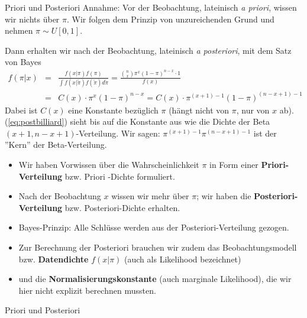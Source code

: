 \documentclass[german]{beamer}
\numberwithin{Bsp}{section}
\numberwithin{Def}{section}
\numberwithin{Stz}{section}
\begin{document}
\begin{frame}{Priori und Posteriori}
Annahme: Vor der Beobachtung, lateinisch \textit{a priori}, wissen wir nichts über $\pi$. Wir folgen dem Prinzip von unzureichenden Grund und nehmen $\pi \sim U[0,1]$. 

Dann erhalten wir nach der Beobachtung, lateinisch \textit{a posteriori}, mit dem Satz von Bayes
\begin{eqnarray}
f(\pi|x)&=&\frac{f(x|\pi)f(\pi)}{\int{f(x|\tilde\pi)f(\tilde\pi)d\tilde\pi}} = \frac{{{n}\choose{x}}\pi^x(1-\pi)^{n-x}\cdot 1}{f(x)} \nonumber\\
&=& C(x) \cdot \pi^x (1-\pi)^{n-x} = C(x) \cdot \pi^{(x+1)-1} (1-\pi)^{(n-x+1)-1} \label{eq:postbilliard}
\end{eqnarray}
Dabei ist $C(x)$ eine Konstante bezüglich $\pi$ (hängt nicht von $\pi$, nur von $x$ ab). (\ref{eq:postbilliard}) sieht bis auf die Konstante aus wie die Dichte der Beta$(x+1,n-x+1)$-Verteilung. Wir sagen: $\pi^{(x+1)-1} \pi^{(n-x+1)-1}$ ist der ''Kern'' der Beta-Verteilung.
\end{frame}

\begin{frame}{}
\begin{itemize}
\item Wir haben Vorwissen über die Wahrscheinlichkeit $\pi$ in Form einer \textbf{Priori-Verteilung} bzw. Priori -Dichte formuliert.
\item Nach der Beobachtung $x$ wissen wir mehr über $\pi$; wir haben die \textbf{Posteriori-Verteilung} bzw. Posteriori-Dichte erhalten.
\item Bayes-Prinzip: Alle Schlüsse werden aus der Posteriori-Verteilung gezogen.
\item Zur Berechnung der Posteriori brauchen wir zudem das Beobachtungsmodell bzw. \textbf{Datendichte} $f(x|\pi)$ (auch als Likelihood bezeichnet)
\item und die \textbf{Normalisierungskonstante} (auch marginale Likelihood), die wir hier nicht explizit berechnen mussten.
 \end{itemize}
\end{frame}

\begin{frame}{Priori und Posteriori}
\mode<article>{
\texttt{[image: ../pics/betapost.png]}
}
\end{frame}
\end{document}
